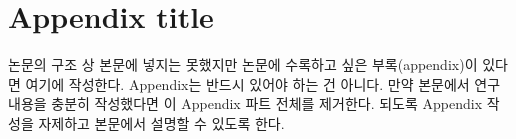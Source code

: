 \documentclass[twoside,11pt]{gshs_thesis}
\begin{document}


\clearpage  %
\appendix
\renewcommand{\thesection}{\Alph{section}} %
\renewcommand{\theequation}{\thesection.\arabic{equation}} %
\renewcommand{\thefigure}{\thesection-\arabic{figure}} %
\renewcommand{\thetable}{\thesection-\arabic{table}} %
\setcounter{equation}{0} %
\setcounter{figure}{0} %
\setcounter{table}{0} %

\section{Appendix title}
논문의 구조 상 본문에 넣지는 못했지만 논문에 수록하고 싶은 부록(appendix)이 있다면 여기에 작성한다. Appendix는 반드시 있어야 하는 건 아니다. 만약 본문에서 연구 내용을 충분히 작성했다면 이 Appendix 파트 전체를 제거한다. 되도록 Appendix 작성을 자제하고 본문에서 설명할 수 있도록 한다.
\end{document}
